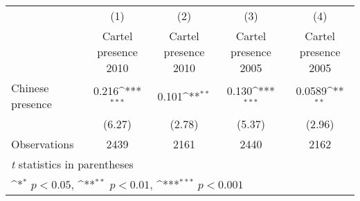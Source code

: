 {
\def\sym#1{\ifmmode^{#1}\else\(^{#1}\)\fi}
\begin{tabular}{l*{4}{c}}
\hline\hline
                    &\multicolumn{1}{c}{(1)}&\multicolumn{1}{c}{(2)}&\multicolumn{1}{c}{(3)}&\multicolumn{1}{c}{(4)}\\
                    &\multicolumn{1}{c}{Cartel presence 2010}&\multicolumn{1}{c}{Cartel presence 2010}&\multicolumn{1}{c}{Cartel presence 2005}&\multicolumn{1}{c}{Cartel presence 2005}\\
\hline
Chinese presence    &       0.216\sym{***}&       0.101\sym{**} &       0.130\sym{***}&      0.0589\sym{**} \\
                    &      (6.27)         &      (2.78)         &      (5.37)         &      (2.96)         \\
\hline
Observations        &        2439         &        2161         &        2440         &        2162         \\
\hline\hline
\multicolumn{5}{l}{\footnotesize \textit{t} statistics in parentheses}\\
\multicolumn{5}{l}{\footnotesize \sym{*} \(p<0.05\), \sym{**} \(p<0.01\), \sym{***} \(p<0.001\)}\\
\end{tabular}
}
